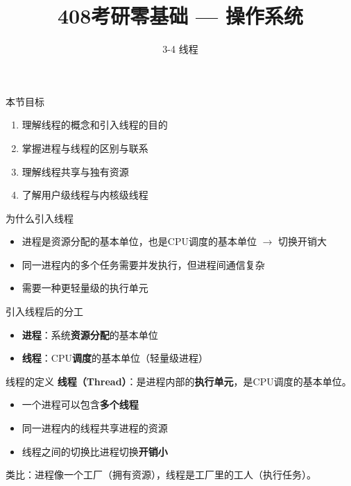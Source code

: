 \documentclass[10pt, aspectratio=169]{beamer}
\title{408考研零基础 --- 操作系统}
\subtitle{3-4 线程}
\author{}
\date{}
\begin{document}
\begin{frame}{本节目标}
    \begin{enumerate}
        \item 理解线程的概念和引入线程的目的
        \item 掌握进程与线程的区别与联系
        \item 理解线程共享与独有资源
        \item 了解用户级线程与内核级线程
    \end{enumerate}
\end{frame}

\begin{frame}{为什么引入线程}
    \begin{itemize}
        \item 进程是资源分配的基本单位，也是CPU调度的基本单位 $\to$ 切换开销大
        \item 同一进程内的多个任务需要并发执行，但进程间通信复杂
        \item 需要一种更轻量级的执行单元
    \end{itemize}
    \vspace{0.5em}
    \begin{block}{引入线程后的分工}
        \begin{itemize}
            \item \textbf{进程}：系统\textbf{资源分配}的基本单位
            \item \textbf{线程}：CPU\textbf{调度}的基本单位（轻量级进程）
        \end{itemize}
    \end{block}
\end{frame}

\begin{frame}{线程的定义}
    \textbf{线程（Thread）}：是进程内部的\textbf{执行单元}，是CPU调度的基本单位。

    \vspace{0.5em}
    \begin{itemize}
        \item 一个进程可以包含\textbf{多个线程}
        \item 同一进程内的线程共享进程的资源
        \item 线程之间的切换比进程切换\textbf{开销小}
    \end{itemize}
    \vspace{0.5em}
    \begin{exampleblock}
        类比：进程像一个工厂（拥有资源），线程是工厂里的工人（执行任务）。
    \end{exampleblock}
\end{frame}
\end{document}
